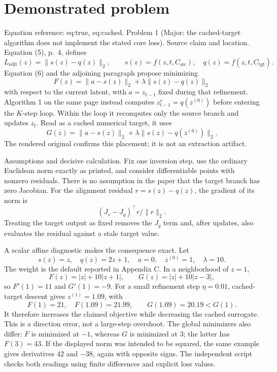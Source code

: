 \documentclass[10pt]{article}
\begin{document}
\section*{Demonstrated problem}
Equation reference: eq:true, eq:cached. Problem 1 (Major: the cached-target algorithm does not implement the stated core loss).  Source claim and location. Equation (5), p. 4, defines \[L_{\mathrm{edit}}(z)=\|s(z)-q(z)\|_2,\qquad
s(z)=f(z,t,C_{\mathrm{src}}),\quad q(z)=f(z,t,C_{\mathrm{tgt}}).\] Equation (6) and the adjoining paragraph propose minimizing \[
F(z)=\|a-s(z)\|_2+\lambda\|s(z)-q(z)\|_2\] with respect to the current latent, with \(a=z_{t-1}\) fixed during that refinement. Algorithm 1 on the same page instead computes \(z^e_{t-1}=q(z^{(0)})\) before entering the \(K\)-step loop. Within the loop it recomputes only the source branch and updates \(z_t\). Read as a cached numerical target, it uses \[
G(z)=\|a-s(z)\|_2+\lambda\|s(z)-q(z^{(0)})\|_2.\] The rendered original confirms this placement; it is not an extraction artifact.\par
Assumptions and decisive calculation. Fix one inversion step, use the ordinary Euclidean norm exactly as printed, and consider differentiable points with nonzero residuals. There is no assumption in the paper that the target branch has zero Jacobian. For the alignment residual \(r=s(z)-q(z)\), the gradient of its norm is \[(J_s-J_q)^\top r/\|r\|_2.\] Treating the target output as fixed removes the \(J_q\) term and, after updates, also evaluates the residual against a stale target value.\par
A scalar affine diagnostic makes the consequence exact. Let \[s(z)=z,\quad q(z)=2z+1,\quad a=0,\quad z^{(0)}=1,\quad\lambda=10.\] The weight is the default reported in Appendix C. In a neighborhood of \(z=1\), \[F(z)=|z|+10|z+1|,\qquad G(z)=|z|+10|z-3|,\] so \(F'(1)=11\) and \(G'(1)=-9\). For a small refinement step \(\eta=0.01\), cached-target descent gives \(z^{(1)}=1.09\), with \[F(1)=21,\quad F(1.09)=21.99,\qquad G(1.09)=20.19<G(1).\] It therefore increases the claimed objective while decreasing the cached surrogate. This is a direction error, not a large-step overshoot. The global minimizers also differ: \(F\) is minimized at \(-1\), whereas \(G\) is minimized at \(3\); the latter has \(F(3)=43\). If the displayed norm was intended to be squared, the same example gives derivatives \(42\) and \(-38\), again with opposite signs. The independent script checks both readings using finite differences and explicit loss values.\par
\end{document}
